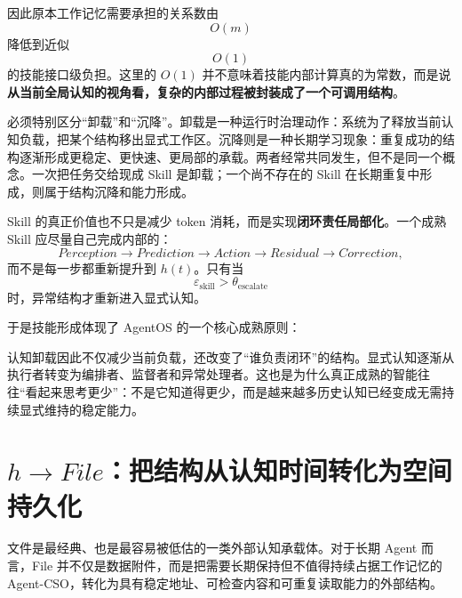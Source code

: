 因此原本工作记忆需要承担的关系数由
\begin{equation}
O(m)
\end{equation}
降低到近似
\begin{equation}
O(1)
\end{equation}
的技能接口级负担。这里的 $O(1)$ 并不意味着技能内部计算真的为常数，而是说\textbf{从当前全局认知的视角看，复杂的内部过程被封装成了一个可调用结构}。

必须特别区分“卸载”和“沉降”。卸载是一种运行时治理动作：系统为了释放当前认知负载，把某个结构移出显式工作区。沉降则是一种长期学习现象：重复成功的结构逐渐形成更稳定、更快速、更局部的承载。两者经常共同发生，但不是同一个概念。一次把任务交给现成 Skill 是卸载；一个尚不存在的 Skill 在长期重复中形成，则属于结构沉降和能力形成。

Skill 的真正价值也不只是减少 token 消耗，而是实现\textbf{闭环责任局部化}。一个成熟 Skill 应尽量自己完成内部的：
\begin{equation}
Perception
\rightarrow
Prediction
\rightarrow
Action
\rightarrow
Residual
\rightarrow
Correction,
\end{equation}
而不是每一步都重新提升到 $h(t)$。只有当
\begin{equation}
\varepsilon_{\mathrm{skill}}>\theta_{\mathrm{escalate}}
\end{equation}
时，异常结构才重新进入显式认知。

于是技能形成体现了 AgentOS 的一个核心成熟原则：
\begin{statementbox}
\centering
{}
\end{statementbox}

认知卸载因此不仅减少当前负载，还改变了“谁负责闭环”的结构。显式认知逐渐从执行者转变为编排者、监督者和异常处理者。这也是为什么真正成熟的智能往往“看起来思考更少”：不是它知道得更少，而是越来越多历史认知已经变成无需持续显式维持的稳定能力。

\section{$h\rightarrow File$：把结构从认知时间转化为空间持久化}

文件是最经典、也是最容易被低估的一类外部认知承载体。对于长期 Agent 而言，File 并不仅是数据附件，而是把需要长期保持但不值得持续占据工作记忆的 Agent-CSO，转化为具有稳定地址、可检查内容和可重复读取能力的外部结构。


